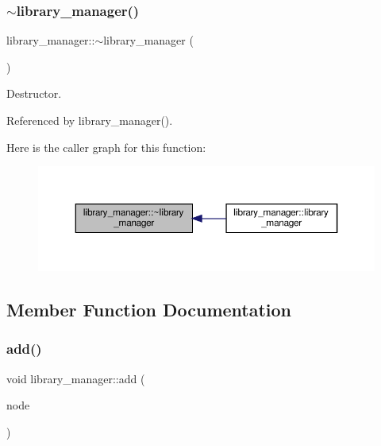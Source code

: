 \subsubsection{\texorpdfstring{$\sim$library\+\_\+manager()}{~library\_manager()}}
{\footnotesize\ttfamily library\+\_\+manager\+::$\sim$library\+\_\+manager (\begin{DoxyParamCaption}{ }\end{DoxyParamCaption})\hspace{0.3cm}{\ttfamily [default]}}



Destructor. 



Referenced by library\+\_\+manager().

Here is the caller graph for this function\+:
\nopagebreak
\begin{figure}[H]
\begin{center}
\leavevmode
\includegraphics[width=350pt]{d8/d35/classlibrary__manager_a51dd14df3ed399e17d62fddfacf54557_icgraph}
\end{center}
\end{figure}


\subsection{Member Function Documentation}
\mbox{\label{classlibrary__manager_a7be2eb51058e7ea1f0e7f465f1bc2e19}} 
\subsubsection{\texorpdfstring{add()}{add()}}
{\footnotesize\ttfamily void library\+\_\+manager\+::add (\begin{DoxyParamCaption}\item[{const \hyperlink{technology__node_8hpp_a33dd193b7bd6b987bf0d8a770a819fa7}{technology\+\_\+node\+Ref} \&}]{node }\end{DoxyParamCaption})}

